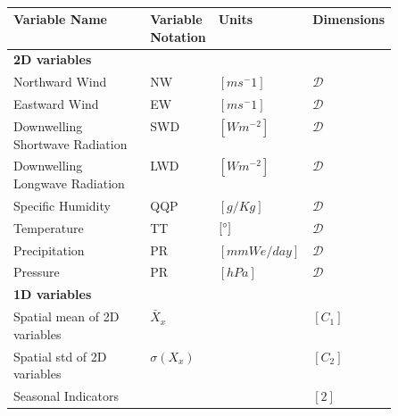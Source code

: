 \begin{table}[tbp]
    \centering
    \caption{}
    \renewcommand\arraystretch{1.5}
    \begin{tabular}{l>{\centering}p{0.1\linewidth}>{\centering}p{0.2\linewidth}>{\centering\arraybackslash}p{0.2\linewidth}}
    \toprule
        \textbf{Variable Name} & \textbf{Variable Notation} & \textbf{Units} & \textbf{Dimensions} \\ \toprule
        \textbf{2D variables} & & & \\ \bottomrule 
        Northward Wind & NW & $[ms^-1]$ & $ \mathcal{D}$   \\ 
        Eastward Wind & EW & $[ms^-1]$ & $ \mathcal{D}$ \\
        Downwelling Shortwave Radiation & SWD & $[Wm^{-2}]$ & $ \mathcal{D}$ \\
        Downwelling Longwave Radiation & LWD & $[Wm^{-2}]$ & $ \mathcal{D}$ \\
        Specific Humidity & QQP & $[g/Kg]$ & $ \mathcal{D}$ \\
        Temperature & TT & $[\degree]$ & $ \mathcal{D}$ \\
        Precipitation & PR & $[mmWe/day]$ & $ \mathcal{D}$  \\
        Pressure & PR & $[hPa]$ & $ \mathcal{D}$  \\
        \toprule
         \textbf{1D variables} & & & \\ \bottomrule
        Spatial mean of 2D variables & $\bar{X}_{x}$ & & $[C_1]$ \\ 
        Spatial std of 2D variables & $\sigma\left(X_{x}\right)$ & & $[C_2]$ \\
        Seasonal Indicators & & & $[2]$\\ \bottomrule
        
    \end{tabular}
            \label{tab:features}
\end{table}